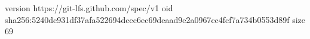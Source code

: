version https://git-lfs.github.com/spec/v1
oid sha256:5240dc931df37afa522694dcec6ec69deaad9e2a0967cc4fcf7a734b0553d89f
size 69
